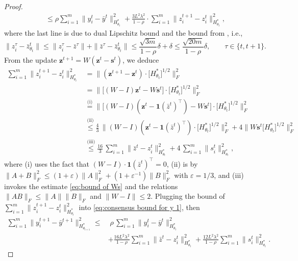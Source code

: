 \documentclass{article}
\theoremstyle{plain}
\theoremstyle{definition}
\theoremstyle{remark}
\newcommand{\sL}{L}
\newcommand{\one}{\mathbf{1}}
\newcommand{\bs}{\mathbf{s}}
\newcommand{\bz}{\mathbf{z}}
\begin{document}
\begin{proof}
\begin{equation}
\begin{aligned}
       &\leq \rho  {\sum}_{i=1}^m\|y_i^t - \bar y^t\|^2_{H_{\theta_t}^*} + \frac{3\sL^2\lambda^2}{1-\rho}\cdot {\sum}_{i=1}^m \|z_i^{t+1} - z_i^t\|_{H^*_{\theta_t}}^2,%
    \end{aligned}
    \end{equation}
    where the last line is due to dual Lipschitz bound  and the bound from , i.e.,
    \[
    \|z_i^\tau-\bar z_{\theta_t}^t\|\leq\|z_i^\tau-\bar z^\tau\|+\|\bar z^\tau-\bar z_{\theta_t}^t\|\leq\frac{\sqrt{3m}}{1-\rho}\delta+\delta\leq\frac{\sqrt{20m}}{1-\rho}\delta,\qquad \tau\in\{t,t+1\}.
    \]
    From the update $\bz^{t+1}  = W (\bz^t -\bs^t)$, we deduce
    \begin{equation*} \begin{aligned}
        {\sum}_{i=1}^m \|z_i^{t+1} - z_i^t\|_{H^*_{\theta_t}}^2 &= \Big\|(\bz^{t+1} - \bz^t)\cdot  \big[H^*_{\theta_t}\big]^{1/2}\Big\|^2_F\\
        &=\Big\|\big[(W-I) \bz^t - W\bs^t \big]\cdot \big[H^*_{\theta_t}\big]^{1/2}\Big\|^2_F\\
        &\overset{\text{(i)}}{=}\Big\|\big[(W-I) (\bz^t - \one (\bar z^t)^\top) - W\bs^t \big] \cdot \big[H^*_{\theta_t}\big]^{1/2}\Big\|^2_F\\
        &\overset{\text{(ii)}}{\leq} \frac{4}{3}\, \Big\|(W-I) (\bz^t - \one (\bar z^t)^\top) \cdot \big[H^*_{\theta_t}\big]^{1/2} \Big\|^2_F + 4 \Big\|W\bs^t \big[H^*_{\theta_t}\big]^{1/2} \Big\|^2_F\\
        &\overset{\text{(iii)}}{\leq} \frac{16}{3} \, {\sum}_{i=1}^m \|\bar z^{t} - z_i^{t}\|_{H_{\theta_{t}}^*}^2 + 4\, {\sum}_{i=1}^m
    \|s^t_i\|_{H_{\theta_t}^*}^2,
    \end{aligned} \end{equation*}
    where (i) uses the fact that $(W-I) \cdot  \one(\bar z^t)^\top=0$, (ii) is by $\|A+B\|_F^2 \leq (1+\varepsilon)\|A\|_F^2 + (1+\varepsilon^{-1})\|B\|_F^2$ with $\varepsilon=1/3$, and (iii) invokes the estimate \eqref{eq:bound of Ws} and the relations $\|AB\|_F \leq \|A\|\|B\|_F$ and $\|W-I\|\leq 2$. Plugging the bound of $\sum_{i=1}^m \|z_i^{t+1} - z_i^t\|_{H^*_{\theta_t}}^2$ into \eqref{eq:consensus bound for y 1}, then
    \begin{equation}
        \label{eq:consensus bound for y 2}
        \begin{aligned}
    {\sum}_{i=1}^m\|y_i^{t+1} - \bar y^{t+1}\|^2_{H_{\theta_{t+1}}^*} \leq  &\;\rho \, {\sum}_{i=1}^m\|y_i^t - \bar y^t\|^2_{H_{\theta_t}^*} \\& + \frac{16\sL^2\lambda^2}{1-\rho} {\sum}_{i=1}^m \|\bar z^{t} - z_i^{t}\|_{H_{\theta_{t}}^*}^2 + \frac{12\sL^2\lambda^2}{1-\rho} {\sum}_{i=1}^m\|s^t_i\|_{H_{\theta_t}^*}^2.

\end{aligned}
\end{equation}
\end{proof}
\end{document}
